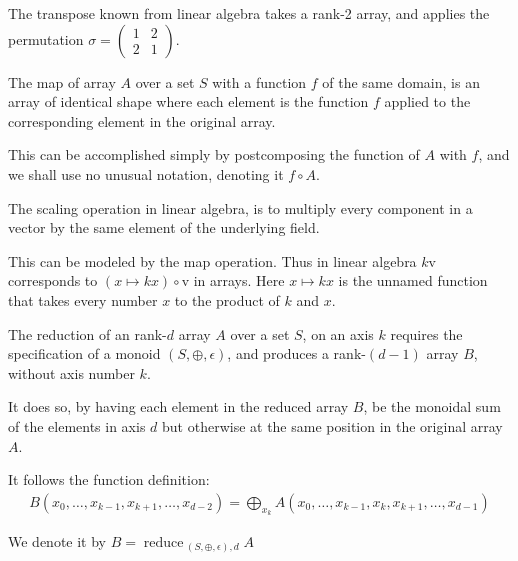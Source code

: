 \documentclass{DIKU-report-variant}
\newcommand\mrm[1]{\mathrm{#1}}
\newcommand\brm[1]{\bm{\mrm{#1}}}
\newcommand\reduce{\operatorname*{\brm{reduce}\,}}
\begin{document}
\begin{example}
  \label{ex:transpose}
  The transpose known from linear algebra takes a rank-2 array, and
  applies the permutation \(\sigma = \left(\begin{smallmatrix} 1 & 2 \\ 2 & 1 \end{smallmatrix}\right)\).
\end{example}

\begin{definition}
  \label{def:map}
  The map of array \(A\) over a set \(S\) with a function \(f\) of the same domain,
  is an array of identical shape where each element is the function \(f\) applied to
  the corresponding element in the original array.

  This can be accomplished simply by postcomposing the function of \(A\)
  with \(f\), and we shall use no unusual notation, denoting it \(f \circ A\).
\end{definition}

\begin{example}
  \label{ex:scaling}
  The scaling operation in linear algebra, is to multiply every component in
  a vector by the same element of the underlying field.

  This can be modeled by the map operation. Thus in linear algebra \(k\brm v\)
  corresponds to \((x \mapsto kx) \circ \brm v\) in arrays. Here \(x \mapsto kx\) is
  the unnamed function that takes every number \(x\) to the product of \(k\) and \(x\).
\end{example}

\begin{definition}
  \label{def:reduce}
  The reduction of an rank-\(d\) array \(A\) over a set \(S\), on
  an axis \(k\) requires the specification of a monoid
  \((S, \oplus, \epsilon)\), and produces a rank-\((d-1)\) array \(B\), without
  axis number \(k\).

  It does so, by having each element in the reduced array \(B\), be the monoidal sum
  of the elements in axis \(d\) but otherwise at the same position in the original array \(A\).

  It follows the function definition:
  \begin{align*}
    B(x_0,\dots,x_{k-1},x_{k+1},\dots,x_{d-2}) = \bigoplus_{x_k} A(x_0,\dots,x_{k-1},x_k,x_{k+1},\dots,x_{d-1})
  \end{align*}

  We denote it by \( B = \reduce_{(S, \oplus, \epsilon),d} A \)
\end{definition}
\end{document}
